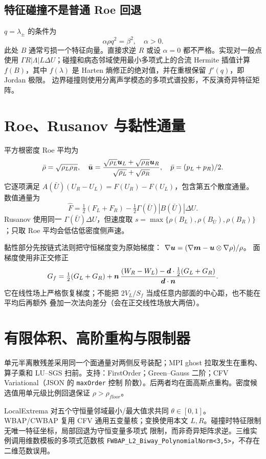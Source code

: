 \documentclass[UTF8,11pt,a4paper]{ctexart}
\begin{document}
\subsection{特征碰撞不是普通 Roe 回退}
$q=\lambda_\pm$ 的条件为
\begin{equation}\alpha\rho q^2=\beta^2,\quad \alpha>0.\end{equation}
此处 $B$ 通常亏损一个特征向量。直接求逆 $R$ 或设 $\alpha=0$ 都不严格。实现对一般点使用
$\Gamma R|\Lambda|L\Delta U$；碰撞和病态邻域使用最小多项式上的合流 Hermite 插值计算
$f(B)$，其中 $f(\lambda)$ 是 Harten 熵修正的绝对值，并在重根保留 $f'(q)$，即 Jordan 极限。
边界碰撞则使用分离声学模态的多项式谱投影，不反演奇异特征矩阵。

\section{Roe、Rusanov 与黏性通量}
平方根密度 Roe 平均为
\begin{equation}
\bar\rho=\sqrt{\rho_L\rho_R},\quad
\bar{\bm{u}}=\frac{\sqrt{\rho_L}\bm{u}_L+\sqrt{\rho_R}\bm{u}_R}
{\sqrt{\rho_L}+\sqrt{\rho_R}},\quad \bar p=(p_L+p_R)/2.
\end{equation}
它逐项满足 $A(\bar U)(U_R-U_L)=F(U_R)-F(U_L)$，包含第五个散度通量。
数值通量为
\[\widehat F=\tfrac12(F_L+F_R)-\tfrac12\Gamma(\bar U)|B(\bar U)|\Delta U.\]
Rusanov 使用同一 $\Gamma(\bar U)\Delta U$，但速度取
$s=\max\{\rho(B_L),\rho(B_{\bar U}),\rho(B_R)\}$；只取 Roe 平均会低估低密度侧声速。

黏性部分先按链式法则把守恒梯度变为原始梯度：
$\nabla\bm{u}=(\nabla\bm{m}-\bm{u}\otimes\nabla\rho)/\rho$。
面梯度使用非正交修正
\begin{equation}
G_f=\tfrac12(G_L+G_R)+\bm{n}\,
\frac{(W_R-W_L)-\bm{d}\cdot\tfrac12(G_L+G_R)}{\bm{d}\cdot\bm{n}}.
\end{equation}
它在线性场上严格恢复梯度；不能把 $2V_L/S_f$ 当成任意内部面的中心距，也不能在平均后再额外
叠加一次法向差分（会在正交线性场放大两倍）。

\section{有限体积、高阶重构与限制器}
单元半离散残差采用同一个面通量对两侧反号装配；MPI ghost 拉取发生在重构、算子乘和 LU--SGS
扫前。支持：FirstOrder；Green--Gauss 二阶；CFV Variational（JSON 的 \texttt{maxOrder} 控制
阶数）。后两者均在面高斯点重构。密度候选值用单元级比例回退保证 $\rho>\rho_{floor}$。

LocalExtrema 对五个守恒量邻域最小/最大值求共同 $\theta\in[0,1]$。WBAP/CWBAP 复用 CFV
通用五变量核；变换使用本文 $L,R$。碰撞时特征限制无唯一特征坐标，局部回退为守恒变量多项式
限制，而非奇异矩阵求逆。三维实例调用维数模板的多项式范数核
\texttt{FWBAP\_L2\_Biway\_PolynomialNorm<3,5>}，不存在二维范数误用。
\end{document}
